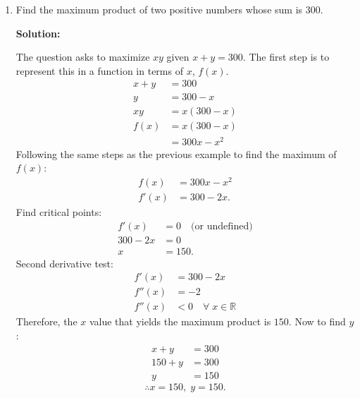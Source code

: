 \documentclass[12pt]{article}
\begin{document}
\begin{enumerate}
                \item Find the maximum product of two positive numbers whose sum is $300$.

                    \noindent \textbf{Solution:}

                    \noindent The question asks to maximize $xy$ given $x+y=300$. The first step is to represent this in a function in terms of $x$, $f(x)$.
                    \begin{align*}
                        x+y &= 300 \\
                        y &= 300 - x \\
                        xy &= x(300-x) \\
                        f(x) &= x(300-x) \\
                        &= 300x - x^2
                    \end{align*}
                    Following the same steps as the previous example to find the maximum of $f(x)$:
                    \begin{align*}
                        f(x) &= 300x - x^2 \\
                        f'(x) &= 300 - 2x.
                    \end{align*}
                    Find critical points:
                    \begin{align*}
                        f'(x) &= 0 \quad \text{(or undefined)} \\
                        300 - 2x & = 0 \\
                        x &= 150.
                    \end{align*}
                    Second derivative test:
                    \begin{align*}
                        f'(x) &= 300 - 2x \\
                        f''(x) &= -2 \\
                        f''(x) &< 0 \quad \forall \; x \in \mathbb{R}
                    \end{align*}
                    Therefore, the $x$ value that yields the maximum product is $150$. Now to find $y$:
                    \begin{align*}
                        x + y &= 300 \\
                        150 + y &= 300 \\
                        y &= 150
                    \end{align*}
                    \[ \therefore x=150, \; y=150. \]


\end{enumerate}
\end{document}

